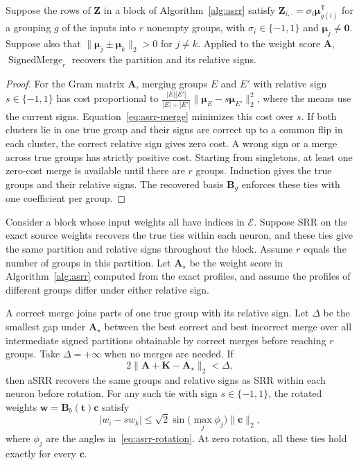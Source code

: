 \begin{lemma}
    \label{lem:theory-signed-merge}
    Suppose the rows of $\mathbf Z$ in a block of Algorithm~\ref{alg:asrr}
    satisfy $\mathbf Z_{i,\cdot}=\sigma_i\boldsymbol\mu_{g(i)}^{\mathsf T}$
    for a grouping $g$ of the inputs into $r$ nonempty groups, with
    $\sigma_i\in\{-1,1\}$ and $\boldsymbol\mu_j\ne\mathbf0$. Suppose also that
    $\|\boldsymbol\mu_j\pm\boldsymbol\mu_k\|_2>0$ for $j\ne k$.
    Applied to the weight score $\mathbf A$,
    $\operatorname{SignedMerge}_r$ recovers the partition and its
    relative signs.
\end{lemma}

\begin{proof}
    For the Gram matrix $\mathbf A$, merging groups $E$ and $E'$ with relative sign
    $s\in\{-1,1\}$ has cost proportional to
    $\frac{|E||E'|}{|E|+|E'|}\|\boldsymbol\mu_E-s\boldsymbol\mu_{E'}\|_2^2$,
    where the means use the current signs. Equation~\eqref{eq:asrr-merge}
    minimizes this cost over $s$. If both clusters lie in one true group
    and their signs are correct up to a common flip in each cluster,
    the correct relative sign gives zero cost. A wrong sign or a
    merge across true groups has strictly positive cost. Starting
    from singletons, at least one zero-cost merge is available until
    there are $r$ groups. Induction gives the true groups and their
    relative signs. The recovered basis $\mathbf B_g$ enforces these
    ties with one coefficient per group.
\end{proof}

\begin{proposition}
    \label{prop:theory-asrr-ties}
    Consider a block whose input weights all have indices in $\mathcal E$.
    Suppose SRR on the exact source weights recovers the true ties within
    each neuron, and these ties give the same partition and relative
    signs throughout the block. Assume $r$ equals the number of groups
    in this partition. Let $\mathbf A_\star$ be the weight score in
    Algorithm~\ref{alg:asrr} computed from the exact profiles, and assume
    the profiles of different groups differ under either relative sign.

    A correct merge joins parts of one true group with its relative sign.
    Let $\Delta$ be the smallest gap under $\mathbf A_\star$ between the
    best correct and best incorrect merge over all intermediate signed
    partitions obtainable by correct merges before reaching $r$ groups.
    Take $\Delta=+\infty$ when no merges are needed. If
    \[
        2\lVert\mathbf A+\mathbf K-\mathbf A_\star\rVert_2<\Delta,
    \]
    then aSRR recovers the same groups and relative signs as SRR within
    each neuron before rotation. For any such tie with sign
    $s\in\{-1,1\}$, the rotated weights
    $\mathbf w=\mathbf B_b(\mathbf t)\mathbf c$ satisfy
    \[
        |w_i-s w_k|\le
        \sqrt{2}\sin\bigl(\max_j\phi_j\bigr)\lVert\mathbf c\rVert_2,
    \]
    where $\phi_j$ are the angles in~\eqref{eq:asrr-rotation}.
    At zero rotation, all these ties hold exactly for every $\mathbf c$.
\end{proposition}

